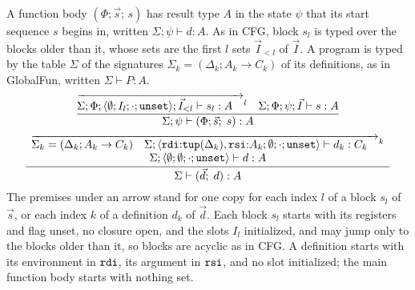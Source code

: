 A function body $(\Phi; \vec{s};\, s)$ has result type $A$ in the state $\psi$
that its start sequence $s$ begins in, written $\Sigma; \psi \vdash d : A$. As
in CFG, block $s_l$ is typed over the blocks older than it, whose sets are the
first $l$ sets $\vec{I}_{<l}$ of $\vec{I}$. A program is typed by the table
$\Sigma$ of the signatures $\Sigma_k = (\Delta_k; A_k \rightarrow C_k)$ of its
definitions, as in GlobalFun, written $\Sigma \vdash P : A$.
{\small\figdefs
{}
\[
  \dfrac{\overrightarrow{\Sigma; \Phi; \langle \emptyset; I_l; \cdot; \mathtt{unset} \rangle;
           \vec{I}_{<l} \vdash s_l : A \quad}^{l}
         \quad \Sigma; \Phi; \psi; \vec{I} \vdash s : A}
        {\Sigma; \psi \vdash (\Phi; \vec{s};\; s) : A}
\]
\[
  \dfrac{\begin{array}{c}
           \overrightarrow{\Sigma_k = (\Delta_k; A_k \rightarrow C_k) \quad
             \Sigma; \langle \mathtt{rdi}{:}\mathtt{tup}(\Delta_k), \mathtt{rsi}{:}A_k; \emptyset; \cdot;
               \mathtt{unset} \rangle \vdash d_k : C_k \quad}^{k}\\
           \Sigma; \langle \emptyset; \emptyset; \cdot; \mathtt{unset} \rangle \vdash d : A
         \end{array}}
        {\Sigma \vdash (\vec{d};\; d) : A}
\]
}
The premises under an arrow stand for one copy for each index $l$ of a block
$s_l$ of $\vec{s}$, or each index $k$ of a definition $d_k$ of $\vec{d}$. Each
block $s_l$ starts with its registers and flag unset, no closure open, and the
slots $I_l$ initialized, and may jump only to the blocks older than it, so
blocks are acyclic as in CFG. A definition starts with its environment in
$\mathtt{rdi}$, its argument in $\mathtt{rsi}$, and no slot initialized; the main
function body starts with nothing set.

